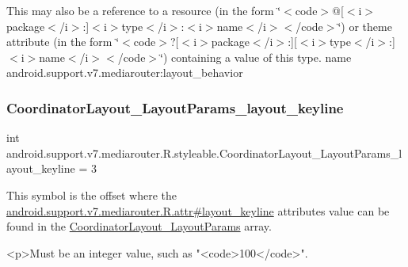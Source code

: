 This may also be a reference to a resource (in the form \char`\"{}$<$code$>$@\mbox{[}$<$i$>$package$<$/i$>$\+:\mbox{]}$<$i$>$type$<$/i$>$\+:$<$i$>$name$<$/i$>$$<$/code$>$\char`\"{}) or theme attribute (in the form \char`\"{}$<$code$>$?\mbox{[}$<$i$>$package$<$/i$>$\+:\mbox{]}\mbox{[}$<$i$>$type$<$/i$>$\+:\mbox{]}$<$i$>$name$<$/i$>$$<$/code$>$\char`\"{}) containing a value of this type.  name android.\+support.\+v7.\+mediarouter\+:layout\+\_\+behavior \mbox{\label{classandroid_1_1support_1_1v7_1_1mediarouter_1_1R_1_1styleable_a9ac79aa4f24497605b5aa2caad3e872c}} 
\subsubsection{\texorpdfstring{Coordinator\+Layout\+\_\+\+Layout\+Params\+\_\+layout\+\_\+keyline}{CoordinatorLayout\_LayoutParams\_layout\_keyline}}
{\footnotesize\ttfamily int android.\+support.\+v7.\+mediarouter.\+R.\+styleable.\+Coordinator\+Layout\+\_\+\+Layout\+Params\+\_\+layout\+\_\+keyline = 3\hspace{0.3cm}{\ttfamily [static]}}

This symbol is the offset where the \hyperlink{classandroid_1_1support_1_1v7_1_1mediarouter_1_1R_1_1attr_a263dd8823e9a80e9dd8ef0b863310f9b}{android.\+support.\+v7.\+mediarouter.\+R.\+attr\#layout\+\_\+keyline} attribute\textquotesingle{}s value can be found in the \hyperlink{classandroid_1_1support_1_1v7_1_1mediarouter_1_1R_1_1styleable_a751aa4d9918369b542c5387a38a26624}{Coordinator\+Layout\+\_\+\+Layout\+Params} array.

\begin{DoxyVerb}      <p>Must be an integer value, such as "<code>100</code>".
\end{DoxyVerb}
 

